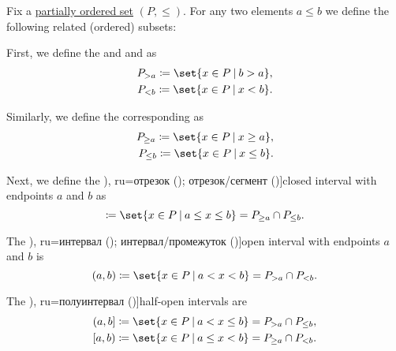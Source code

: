 \begin{definition}\label{def:order_interval}
  Fix a \hyperref[def:partially_ordered_set]{partially ordered set} \( (P, \leq) \). For any two elements \( a \leq b \) we define the following related (ordered) subsets:

  \begin{thmenum}
     First, we define the  and  and as
    \begin{equation*}
      \begin{aligned}
        P_{>a} \coloneqq \set{ x \in P \given b > a },
        \\
        P_{<b} \coloneqq \set{ x \in P \given x < b }.
      \end{aligned}
    \end{equation*}

    Similarly, we define the corresponding  as
    \begin{equation*}
      \begin{aligned}
        P_{\geq a} \coloneqq \set{ x \in P \given x \geq a },
        \\
        P_{\leq b} \coloneqq \set{ x \in P \given x \leq b }.
      \end{aligned}
    \end{equation*}

     Next, we define the \term[bg=затворен интервал (\cite[39]{Тагамлицки1971Диф}), ru=отрезок (\cite[82]{АлександровМаркушевичХинчинЭнциклопедия1951Том1}); отрезок/сегмент (\cite[def. 6]{Александров1977Топология})]{closed interval} with endpoints \( a \) and \( b \) as
    \begin{equation*}
      [a, b] \coloneqq \set{ x \in P \given a \leq x \leq b } = P_{\geq a} \cap P_{\leq b}.
    \end{equation*}

     The \term[bg=отворен интервал (\cite[39]{Тагамлицки1971Диф}), ru=интервал (\cite[82]{АлександровМаркушевичХинчинЭнциклопедия1951Том1}); интервал/промежуток (\cite[def. 6]{Александров1977Топология})]{open interval} with endpoints \( a \) and \( b \) is
    \begin{equation*}
      (a, b) \coloneqq \set{ x \in P \given a < x < b } = P_{> a} \cap P_{< b}.
    \end{equation*}

     The \term[bg=полузатворен интервал (\cite[39]{Тагамлицки1971Диф}), ru=полуинтервал (\cite[82]{АлександровМаркушевичХинчинЭнциклопедия1951Том1})]{half-open intervals} are
    \begin{equation*}
      \begin{aligned}
        (a, b] \coloneqq \set{ x \in P \given a < x \leq b } = P_{> a} \cap P_{\leq b},
        \\
        [a, b) \coloneqq \set{ x \in P \given a \leq x < b } = P_{\geq a} \cap P_{< b}.
      \end{aligned}
    \end{equation*}
  \end{thmenum}
\end{definition}
